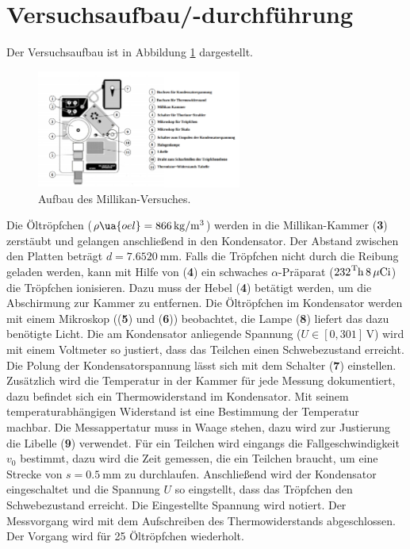 \section{Versuchsaufbau/-durchführung}

Der Versuchsaufbau ist in Abbildung \ref{fig: versuchsaufabu} dargestellt.
\begin{figure}
  \centering
  \includegraphics[width=0.6\textwidth]{pics/aufbau.png}
  \caption{Aufbau des Millikan-Versuches\cite{anleitung503}.}
  \label{fig: versuchsaufabu}
  \end{figure}
Die Öltröpfchen ($\rho\ua{oel}=\SI{866}{\kilogram\per\cubic\meter}$) werden in die Millikan-Kammer (\textbf{3}) zerstäubt
und gelangen anschließend in den Kondensator. Der Abstand zwischen den Platten beträgt $d=\SI{7.6520}{\milli\meter}$.
Falls die Tröpfchen nicht durch die
Reibung geladen werden, kann mit Hilfe von (\textbf{4}) ein schwaches
$\alpha$-Präparat ($\ce{{232}^Th}\,8\,\mu\ce{Ci}$) die Tröpfchen ionisieren. Dazu
muss der Hebel (\textbf{4}) betätigt werden, um die Abschirmung zur Kammer
zu entfernen.
Die Öltröpfchen im Kondensator werden mit einem Mikroskop ((\textbf{5}) und (\textbf{6})) beobachtet,
die Lampe (\textbf{8}) liefert das dazu benötigte Licht.
Die am Kondensator anliegende Spannung ($U\in\left[0,301\right]\,\si{\volt}$) %
wird mit einem Voltmeter so justiert, dass das Teilchen einen Schwebezustand erreicht. %
Die Polung der Kondensatorspannung lässt sich mit dem Schalter (\textbf{7}) einstellen.
Zusätzlich wird die Temperatur in der Kammer für jede Messung dokumentiert, dazu befindet sich
ein Thermowiderstand im Kondensator. Mit seinem temperaturabhängigen Widerstand ist eine Bestimmung
der Temperatur machbar. %
Die Messappertatur muss in Waage stehen, dazu wird zur Justierung die %
Libelle (\textbf{9}) verwendet.
Für ein Teilchen wird eingangs die Fallgeschwindigkeit $v_0$ bestimmt, dazu
wird die Zeit gemessen, die ein Teilchen braucht, um eine Strecke von $s=\SI{0.5}{\milli\meter}$
zu durchlaufen. Anschließend wird der Kondensator eingeschaltet und die Spannung
$U$ so eingstellt, dass das Tröpfchen den Schwebezustand erreicht. Die Eingestellte %
Spannung wird notiert. Der Messvorgang wird mit dem Aufschreiben des Thermowiderstands %
abgeschlossen. Der Vorgang wird für 25 Öltröpfchen wiederholt.
